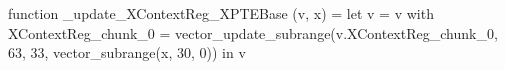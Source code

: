 function _update_XContextReg_XPTEBase (v, x) = let v = { v with XContextReg_chunk_0 = vector_update_subrange(v.XContextReg_chunk_0, 63, 33, vector_subrange(x, 30, 0)) } in v
